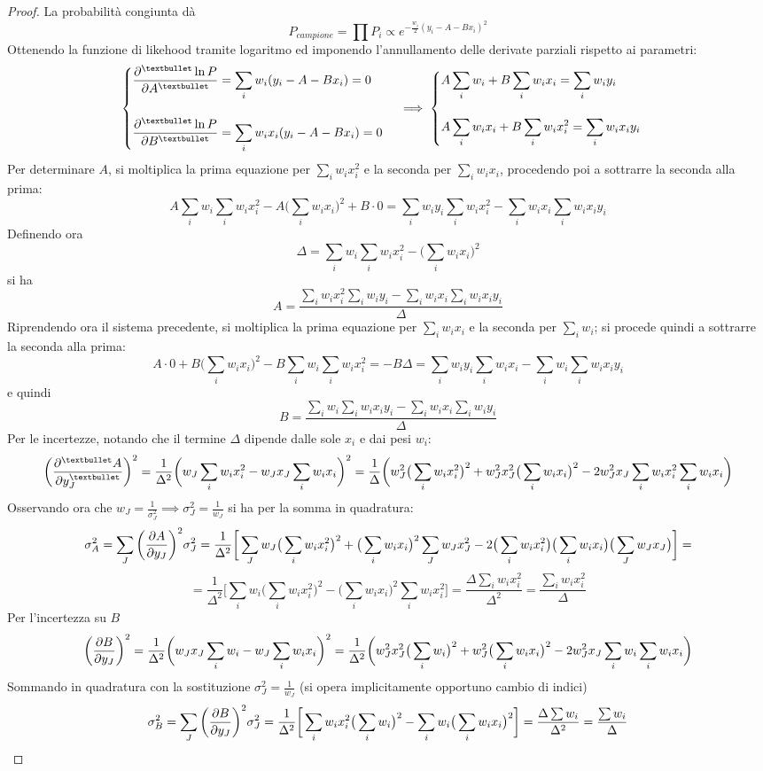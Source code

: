 \documentclass[10pt, oneside]{book}
\newcommand{\casess}[2]{
\begin{cases} 
\displaystyle #1 \\ \\ 
\displaystyle #2
\end{cases}
}
\begin{document}
\begin{proof}
La probabilità congiunta dà
\[P_{campione} = \prod P_i \propto e^{\displaystyle - \frac{w_i}{2} (y_i - A - Bx_i)^2}\]
Ottenendo la funzione di likehood tramite logaritmo ed imponendo l'annullamento delle derivate parziali rispetto ai parametri:
\[\casess{\pdv[•]{\ln P}{A} = \sum_i w_i (y_i - A - Bx_i) = 0}{\pdv[•]{\ln P}{B} = \sum_i w_i x_i (y_i - A - Bx_i) = 0} \implies \casess{A \sum_i w_i + B \sum_i w_i x_i = \sum_i w_i y_i}{A \sum_i w_i x_i + B \sum_i w_i x_i^2 = \sum_i w_i x_i y_i}\]
Per determinare $A$, si moltiplica la prima equazione per $\displaystyle \sum_i w_i x_i^2$ e la seconda per $\displaystyle \sum_i w_i x_i$, procedendo poi a sottrarre la seconda alla prima:
\[A \sum_i w_i \sum_i w_i x_i^2 - A \bigg(\sum_i w_i x_i\bigg)^2 + B \cdot 0 = \sum_i w_i y_i \sum_i w_i x_i^2 - \sum_i w_i x_i \sum_i w_i x_i y_i\]
Definendo ora
\[\Delta = \sum_i w_i \sum_i w_i x_i^2 - \bigg(\sum_i w_i x_i\bigg)^2\]
si ha
\[A = \frac{\sum_i w_i x_i^2 \sum_i w_i y_i - \sum_i w_i x_i \sum_i w_i x_i y_i}{\Delta}\]
Riprendendo ora il sistema precedente, si moltiplica la prima equazione per $\displaystyle \sum_i w_i x_i$ e la seconda per $\displaystyle \sum_i w_i$; si procede quindi a sottrarre la seconda alla prima:
\[A \cdot 0 + B \bigg(\sum_i w_i x_i\bigg)^2 - B \sum_i w_i \sum_i w_i x_i^2 = - B \Delta = \sum_i w_i y_i \sum_i w_i x_i - \sum_i w_i \sum_i w_i x_i y_i\]
e quindi
\[B = \frac{\sum_i w_i \sum_i w_i x_i y_i - \sum_i w_i x_i \sum_i w_i y_i}{\Delta}\]
Per le incertezze, notando che il termine $\Delta$ dipende dalle sole $x_i$ e dai pesi $w_i$:
\[\bigg(\pdv[•]{A}{y_J}\bigg)^2 = \frac{1}{\Delta^2} \bigg(w_J \sum_i w_i x_i^2 - w_J x_J \sum_i w_i x_i\bigg)^2 = \frac{1}{\Delta} \bigg(w_J^2 \big(\sum_i w_i x_i^2\big)^2 + w_J^2 x_J^2 \big(\sum_i w_i x_i\big)^2 - 2 w_J^2 x_J \sum_i w_i x_i^2 \sum_i w_i x_i\bigg)\]
Osservando ora che $\displaystyle w_J = \frac{1}{\sigma_J^2} \implies \sigma_J^2 = \frac{1}{w_J}$ si ha per la somma in quadratura:
\[\sigma_A^2 = \sum_J \bigg(\pdv{A}{y_J}\bigg)^2 \sigma_J^2 = \frac{1}{\Delta^2} \bigg[\sum_J w_J \big(\sum_i w_i x_i^2\big)^2 + \big(\sum_i w_i x_i\big)^2 \sum_J w_J x_J^2 - 2 \big(\sum_i w_i x_i^2\big) \big(\sum_i w_i x_i\big)\big(\sum_J w_J x_J\big)\bigg] =\]
\[= \frac{1}{\Delta^2} \bigg[\sum_i w_i \big(\sum_i w_i x_i^2\big)^2 - \big(\sum_i w_i x_i\big)^2 \sum_i w_i x_i^2\bigg] = \frac{\Delta \sum_i w_i x_i^2}{\Delta^2} = \frac{\sum_i w_i x_i^2}{\Delta}\]
Per l'incertezza su $B$
\[\bigg(\pdv{B}{y_J}\bigg)^2 = \frac{1}{\Delta^2} \bigg(w_J x_J \sum_i w_i - w_J \sum_i w_i x_i\bigg)^2 = \frac{1}{\Delta^2} \bigg(w_J^2 x_J^2 \big(\sum_i w_i\big)^2 + w_J^2 \big(\sum_i w_i x_i\big)^2 - 2 w_J^2 x_J \sum_i w_i \sum_i w_i x_i\bigg)\]
Sommando in quadratura con la sostituzione $\displaystyle \sigma_J^2 = \frac{1}{w_J}$ (si opera implicitamente opportuno cambio di indici)
\[\sigma_B^2 = \sum_J \bigg(\pdv{B}{y_J}\bigg)^2 \sigma_J^2 = \frac{1}{\Delta^2} \bigg[\sum_i w_i x_i^2 \big(\sum_i w_i\big)^2 - \sum_i w_i \big(\sum_i w_i x_i\big)^2\bigg] = \frac{\Delta \sum w_i}{\Delta^2} = \frac{\sum w_i}{\Delta}\]







\end{proof}
\end{document}
